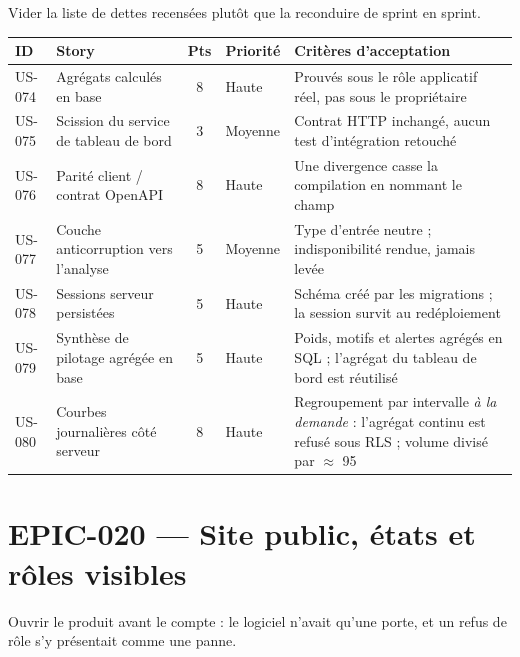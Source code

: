 Vider la liste de dettes recensées plutôt que la reconduire de sprint en sprint.

\begin{center}
\begin{tabular}{lp{6.6cm}cl p{4.6cm}}
\toprule
\textbf{ID} & \textbf{Story} & \textbf{Pts} & \textbf{Priorité} & \textbf{Critères d'acceptation} \\
\midrule
US-074 & Agrégats calculés en base            & 8 & Haute   & Prouvés sous le rôle applicatif réel, pas sous le propriétaire \\
US-075 & Scission du service de tableau de bord & 3 & Moyenne & Contrat HTTP inchangé, aucun test d'intégration retouché \\
US-076 & Parité client / contrat OpenAPI      & 8 & Haute   & Une divergence casse la compilation en nommant le champ \\
US-077 & Couche anticorruption vers l'analyse & 5 & Moyenne & Type d'entrée neutre ; indisponibilité rendue, jamais levée \\
US-078 & Sessions serveur persistées          & 5 & Haute   & Schéma créé par les migrations ; la session survit au redéploiement \\
US-079 & Synthèse de pilotage agrégée en base & 5 & Haute   & Poids, motifs et alertes agrégés en SQL ; l'agrégat du tableau de bord est réutilisé \\
US-080 & Courbes journalières côté serveur    & 8 & Haute   & Regroupement par intervalle \emph{à la demande} : l'agrégat continu est refusé sous RLS ; volume divisé par $\approx$ 95 \\
\bottomrule
\end{tabular}
\end{center}

\section{EPIC-020 --- Site public, états et rôles visibles}

Ouvrir le produit avant le compte : le logiciel n'avait qu'une porte, et un
refus de rôle s'y présentait comme une panne.

